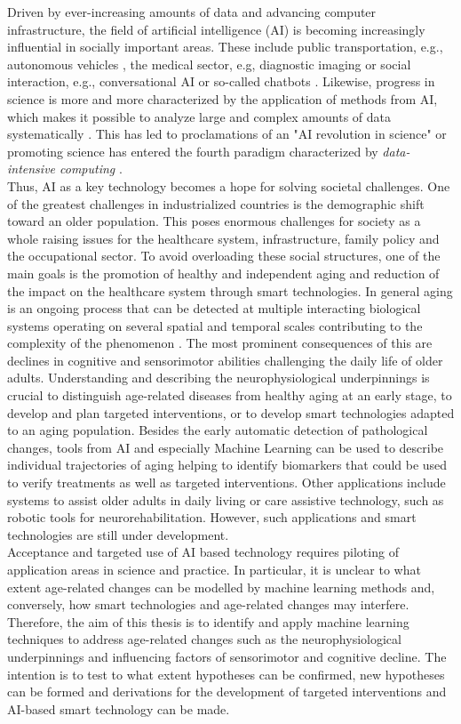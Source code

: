 Driven by ever-increasing amounts of data and advancing computer infrastructure, the field of artificial intelligence (AI) is becoming increasingly influential in socially important areas. These include public transportation, e.g., autonomous vehicles \cite{Leonard2020}, the medical sector, e.g, diagnostic imaging \cite{Liu2020} or social interaction, e.g., conversational AI or so-called chatbots \cite{Adamopoulou2020}. Likewise, progress in science is more and more characterized by the application of methods from AI, which makes it possible to analyze large and complex amounts of data systematically \cite{Brunton2019}. This has led to proclamations of an "AI revolution in science" \cite{Appenzeller2017} or promoting science has entered the fourth paradigm characterized by \textit{data-intensive computing} \cite{Hey2009}.\\
Thus, AI as a key technology becomes a hope for solving societal challenges. One of the greatest challenges in industrialized countries is the demographic shift toward an older population. This poses enormous challenges for society as a whole raising issues for the healthcare system, infrastructure, family policy and the occupational sector. To avoid overloading these social structures, one of the main goals is the promotion of healthy and independent aging and reduction of the impact on the healthcare system through smart technologies. In general aging is an ongoing process that can be detected at multiple interacting biological systems operating on several spatial and temporal scales contributing to the complexity of the phenomenon \cite{Mooney2016}. The most prominent consequences of this are declines in cognitive and sensorimotor abilities challenging the daily life of older adults. Understanding and describing the neurophysiological underpinnings is crucial to distinguish age-related diseases from healthy aging at an early stage, to develop and plan targeted interventions, or to develop smart technologies adapted to an aging population. Besides the early automatic detection of pathological changes, tools from AI and especially Machine Learning can be used to describe individual trajectories of aging helping to identify biomarkers that could be used to verify treatments as well as targeted interventions. Other applications include systems to assist older adults in daily living or care assistive technology, such as robotic tools for neurorehabilitation. However, such applications and smart technologies are still under development.\\
Acceptance and targeted use of AI based technology requires piloting of application areas in science and practice. In particular, it is unclear to what extent age-related changes can be modelled by machine learning methods and, conversely, how smart technologies and age-related changes may interfere. Therefore, the aim of this thesis is to identify and apply machine learning techniques to address age-related changes such as the neurophysiological underpinnings and influencing factors of sensorimotor and cognitive decline. The intention is to test to what extent hypotheses can be confirmed, new hypotheses can be formed and derivations for the development of targeted interventions and AI-based smart technology can be made.

